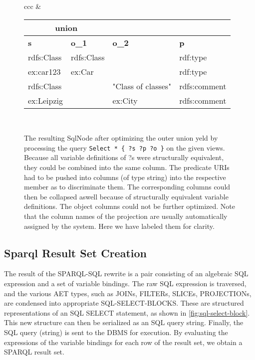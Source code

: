 \documentclass[a4paper,twoside,bibtotoc,abstracton,12pt,BCOR=15mm]{scrreprt}
\begin{document}
\begin{figure}[!h]
\begin{tabular}{ccc}
&

\begin{minipage}{5cm}
\begin{tiny}
\begin{tabular}{|l|l|l|l|} \cline{1-2}
\multicolumn{2}{|c|}{union} \\ \hline
\textbf{s} & \textbf{o\_1} & \textbf{o\_2} & \textbf{p} \\\hline
rdfs:Class & rdfs:Class & & rdf:type \\ \hline
ex:car123 & ex:Car & & rdf:type \\ \hline
rdfs:Class & & "Class of classes" & rdfs:comment\\ \hline
ex:Leipzig & & ex:City & rdfs:comment \\ \hline
\end{tabular}
\end{tiny}
\end{minipage}


\\ \bottomrule



\end{tabular}
\caption{The resulting SqlNode after optimizing the outer union yeld by processing the query \texttt{Select * \{ ?s ?p ?o \}} on the given views.
Because all variable definitions of ?s were structurally equivalent, they could be combined into the same column.
The predicate URIs had to be pushed into columns (of type string) into the respective member as to discriminate them.
The corresponding columns could then be collapsed aswell because of structurally equivalent variable definitions.
The object columns could not be further optimized. Note that the column names of the projection are usually automatically assigned by the system. Here we have labeled them for clarity.}
\end{figure}

  



\subsection{Sparql Result Set Creation}
The result of the SPARQL-SQL rewrite is a pair consisting of an algebraic SQL expression and a set of variable bindings.
The raw SQL expression is traversed, and the various AET types, such as JOINs, FILTERs, SLICEs, PROJECTIONs, are
condensed into appropriate SQL-SELECT-BLOCKS. These are structured representations of an SQL SELECT statement, as shown in \autoref{fig:sql-select-block}.
This new structure can then be serialized as an SQL query string. Finally, the SQL query (string) is sent to the DBMS for execution.
By evaluating the expressions of the variable bindings for each row of the result set, we obtain a SPARQL result set.  
\end{document}
